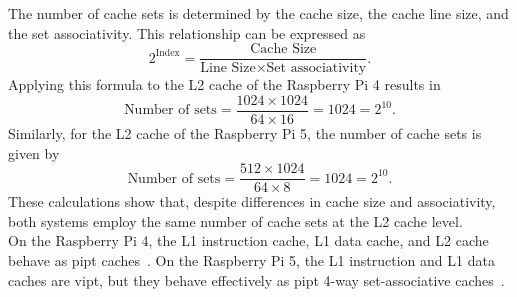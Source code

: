         The number of cache sets is determined by the cache size, the cache line size, and the set associativity. 
        This relationship can be expressed as
        \[
        2^{\text{Index}} = \frac{\text{Cache Size}}{\text{Line Size} \times \text{Set associativity}}.
        \]
        Applying this formula to the L2 cache of the Raspberry Pi 4 results in
        \[
        \text{Number of sets} = \frac{1024 \times 1024}{64 \times 16} = 1024 = 2^{10}.
        \]
        Similarly, for the L2 cache of the Raspberry Pi 5, the number of cache sets is given by
        \[
        \text{Number of sets} = \frac{512 \times 1024}{64 \times 8} = 1024 = 2^{10}.
        \]
        These calculations show that, despite differences in cache size and associativity, both systems employ 
        the same number of cache sets at the L2 cache level.
        \\
        On the Raspberry Pi 4, the L1 instruction cache, L1 data cache, and L2 cache behave as \gls{pipt} caches~\cite{webRPi4Hardware, docCortexA72}. 
        On the Raspberry Pi 5, the L1 instruction and L1 data caches are \gls{vipt}, but they behave effectively as \gls{pipt}
        4-way set-associative caches~\cite{docCortexA76}.
    

